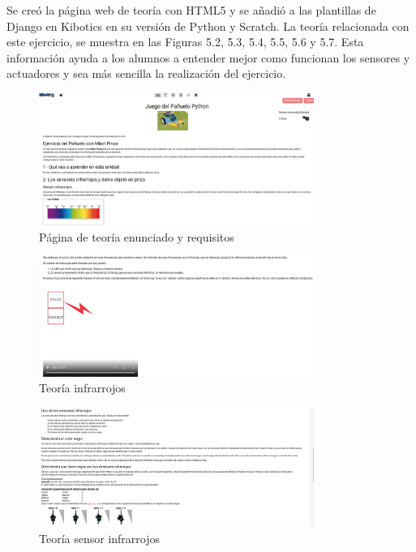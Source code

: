 Se creó la página web de teoría con HTML5  y se añadió a las plantillas de Django en Kibotics en su versión de Python y Scratch. La teoría relacionada con este ejercicio, se muestra en las Figuras 5.2, 5.3, 5.4, 5.5, 5.6 y 5.7. Esta información ayuda a  los alumnos a entender mejor como funcionan los sensores y actuadores y sea más sencilla la realización del ejercicio.

\begin{figure}[H]
    \centering
    \includegraphics[width=0.8\textwidth, height=0.4\textwidth]{chapters/images/teoriag1.png}
    \caption{Página de teoría enunciado y requisitos}
    \label{fig:my_label}
\end{figure}
\begin{figure}[H]
    \centering
    \includegraphics[width=0.8\textwidth, height=0.4\textwidth]{chapters/images/teoriag2.png}
    \caption{Teoría infrarrojos}
    \label{fig:my_label}
\end{figure}
\begin{figure}[H]
    \centering
    \includegraphics[width=0.8\textwidth, height=0.4\textwidth]{chapters/images/teoriag3.png}
    \caption{Teoría sensor infrarrojos}
    \label{fig:my_label}
\end{figure}

